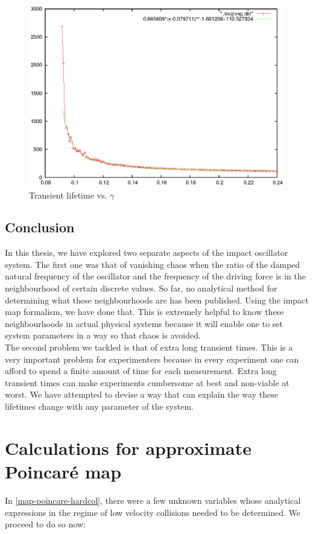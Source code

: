 \documentclass[oneside]{book}
\renewcommand{\(}{\begin{columns}}
\renewcommand{\)}{\end{columns}}
\newcommand{\<}[1]{\begin{column}{#1}}
\renewcommand{\>}{\end{column}}
\begin{document}
\begin{figure}
\caption{Transient lifetime vs.  $\gamma$}
\begin{center}
\includegraphics[width=0.8\columnwidth]{trans_life_vsg_matches_somewhat}
\end{center}
\end{figure}


\section{Conclusion}
In this thesis, we have explored two separate aspects of the impact oscillator 
system.  The first one was that of vanishing chaos when the ratio of the 
damped natural frequency of the oscillator and the frequency of the driving 
force is in the neighbourhood of certain discrete values.  So far, no 
analytical method 
for determining what these neighbourhoods are has been published. Using the 
	impact map formalism, we have done that.  This is extremely helpful
to know these neighbourhoods in actual physical systems because it will enable 
one to set system parameters in a way so that chaos is avoided.  \\

The second problem we tackled is that of extra long transient times.  This is 
a very important problem for experimenters because in every experiment one can 
afford to spend a finite amount of time for each measurement.  Extra long 
transient times can make experiments cumbersome at best and non-viable at 
worst.  We have attempted to devise a way that can explain the way these lifetimes change with any 
parameter of the system.  



\appendix
\chapter{Calculations for approximate Poincaré map}
In \eqref{map-poincare-hardcol}, there were a few unknown variables whose 
analytical expressions in the regime of low velocity collisions 
needed to be determined.  We proceed to do so now:
\end{document}
